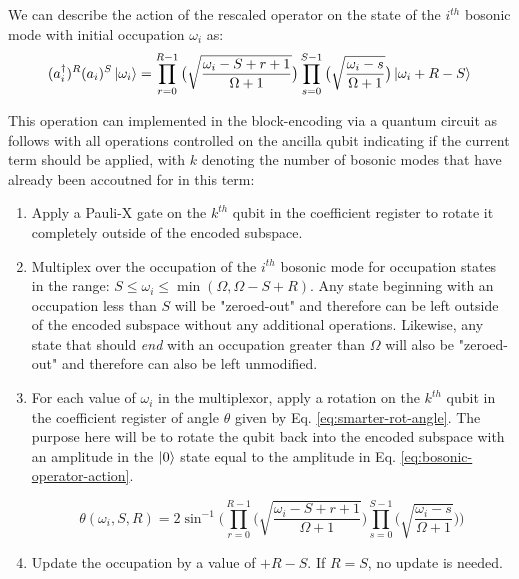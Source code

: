 We can describe the action of the rescaled operator on the state of the $i^{th}$ bosonic mode with initial occupation $\omega_i$ as:
\begin{equation}
    \label{eq:bosonic-operator-action}
    (a_i^\dagger)^R (a_i)^S \ket{\omega_i} = \prod_{r=0}^{R-1} \big( \sqrt{\frac{\omega_i - S + r + 1}{\Omega + 1}} \big) \prod_{s=0}^{S-1} \big( \sqrt{\frac{\omega_i - s}{\Omega + 1}} \big) \ket{\omega_i + R - S}
\end{equation}

This operation can implemented in the block-encoding via a quantum circuit as follows with all operations controlled on the ancilla qubit indicating if the current term should be applied, with $k$ denoting the number of bosonic modes that have already been accoutned for in this term:
\begin{enumerate}
    \item Apply a Pauli-X gate on the $k^{th}$ qubit in the coefficient register to rotate it completely outside of the encoded subspace.
    \item Multiplex over the occupation of the $i^{th}$ bosonic mode for occupation states in the range: $S \leq \omega_i \leq \min(\Omega, \Omega - S + R)$. Any state beginning with an occupation less than $S$ will be "zeroed-out" and therefore can be left outside of the encoded subspace without any additional operations. Likewise, any state that should \textit{end} with an occupation greater than $\Omega$ will also be "zeroed-out" and therefore can also be left unmodified.
    \item For each value of $\omega_i$ in the multiplexor, apply a rotation on the $k^{th}$ qubit in the coefficient register of angle $\theta$ given by Eq. \ref{eq:smarter-rot-angle}. The purpose here will be to rotate the qubit back into the encoded subspace with an amplitude in the $\ket{0}$ state equal to the amplitude in Eq. \ref{eq:bosonic-operator-action}. 

    \begin{equation}
        \label{eq:smarter-rot-angle}
        \theta(\omega_i, S, R) = 2 \sin^{-1}{\Big(\prod_{r=0}^{R-1} \big( \sqrt{\frac{\omega_i - S + r + 1}{\Omega + 1}} \big) \prod_{s=0}^{S-1} \big( \sqrt{\frac{\omega_i - s}{\Omega + 1}} \big)\Big)}
    \end{equation}

    \item Update the occupation by a value of $+ R - S$. If $R = S$, no update is needed.
\end{enumerate}

